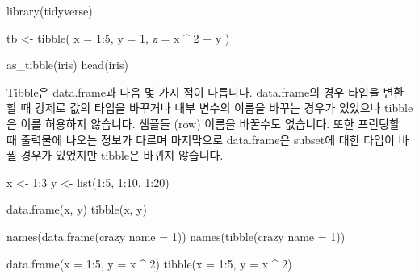 \documentclass[
]{book}
\newenvironment{Shaded}{\begin{snugshade}}{\end{snugshade}}
\newcommand{\AttributeTok}[1]{\textcolor[rgb]{0.77,0.63,0.00}{#1}}
\newcommand{\DecValTok}[1]{\textcolor[rgb]{0.00,0.00,0.81}{#1}}
\newcommand{\FunctionTok}[1]{\textcolor[rgb]{0.00,0.00,0.00}{#1}}
\newcommand{\NormalTok}[1]{#1}
\newcommand{\OtherTok}[1]{\textcolor[rgb]{0.56,0.35,0.01}{#1}}
\newcommand{\SpecialCharTok}[1]{\textcolor[rgb]{0.00,0.00,0.00}{#1}}
\newcommand{\StringTok}[1]{\textcolor[rgb]{0.31,0.60,0.02}{#1}}
\begin{document}
\begin{Shaded}
\begin{Highlighting}[]
\FunctionTok{library}\NormalTok{(tidyverse)}

\NormalTok{tb }\OtherTok{\textless{}{-}} \FunctionTok{tibble}\NormalTok{(}
  \AttributeTok{x =} \DecValTok{1}\SpecialCharTok{:}\DecValTok{5}\NormalTok{, }
  \AttributeTok{y =} \DecValTok{1}\NormalTok{, }
  \AttributeTok{z =}\NormalTok{ x }\SpecialCharTok{\^{}} \DecValTok{2} \SpecialCharTok{+}\NormalTok{ y}
\NormalTok{)}

\FunctionTok{as\_tibble}\NormalTok{(iris)}
\FunctionTok{head}\NormalTok{(iris)}
\end{Highlighting}
\end{Shaded}

Tibble은 data.frame과 다음 몇 가지 점이 다릅니다. data.frame의 경우 타입을 변환할 때 강제로 값의 타입을 바꾸거나 내부 변수의 이름을 바꾸는 경우가 있었으나 tibble은 이를 허용하지 않습니다. 샘플들 (row) 이름을 바꿀수도 없습니다. 또한 프린팅할 때 출력물에 나오는 정보가 다르며 마지막으로 data.frame은 subset에 대한 타입이 바뀔 경우가 있었지만 tibble은 바뀌지 않습니다.

\begin{Shaded}
\begin{Highlighting}[]
\NormalTok{x }\OtherTok{\textless{}{-}} \DecValTok{1}\SpecialCharTok{:}\DecValTok{3}
\NormalTok{y }\OtherTok{\textless{}{-}} \FunctionTok{list}\NormalTok{(}\DecValTok{1}\SpecialCharTok{:}\DecValTok{5}\NormalTok{, }\DecValTok{1}\SpecialCharTok{:}\DecValTok{10}\NormalTok{, }\DecValTok{1}\SpecialCharTok{:}\DecValTok{20}\NormalTok{)}

\FunctionTok{data.frame}\NormalTok{(x, y)}
\FunctionTok{tibble}\NormalTok{(x, y)}
\end{Highlighting}
\end{Shaded}

\begin{Shaded}
\begin{Highlighting}[]
\FunctionTok{names}\NormalTok{(}\FunctionTok{data.frame}\NormalTok{(}\StringTok{\textasciigrave{}}\AttributeTok{crazy name}\StringTok{\textasciigrave{}} \OtherTok{=} \DecValTok{1}\NormalTok{))}
\FunctionTok{names}\NormalTok{(}\FunctionTok{tibble}\NormalTok{(}\StringTok{\textasciigrave{}}\AttributeTok{crazy name}\StringTok{\textasciigrave{}} \OtherTok{=} \DecValTok{1}\NormalTok{))}
\end{Highlighting}
\end{Shaded}

\begin{Shaded}
\begin{Highlighting}[]
\FunctionTok{data.frame}\NormalTok{(}\AttributeTok{x =} \DecValTok{1}\SpecialCharTok{:}\DecValTok{5}\NormalTok{, }\AttributeTok{y =}\NormalTok{ x }\SpecialCharTok{\^{}} \DecValTok{2}\NormalTok{)}
\FunctionTok{tibble}\NormalTok{(}\AttributeTok{x =} \DecValTok{1}\SpecialCharTok{:}\DecValTok{5}\NormalTok{, }\AttributeTok{y =}\NormalTok{ x }\SpecialCharTok{\^{}} \DecValTok{2}\NormalTok{)}
\end{Highlighting}
\end{Shaded}
\end{document}

